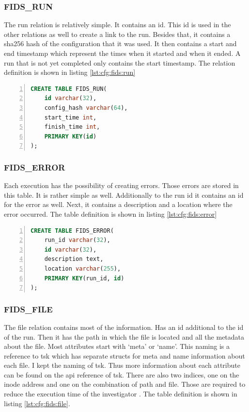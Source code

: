 \subsubsection{FIDS\_RUN}

The run relation is relatively simple. It contains an \gls{id}. This \gls{id} is used in the other relations as well to create a link to the run. Besides that, it contains a \gls{sha256} hash of the configuration that it was used. It then contains a start and end timestamp which represent the times when it started and when it ended. A run that is not yet completed only contains the start timestamp. The relation definition is shown in listing \ref{lst:cfg:fids:run}

\begin{lstlisting}[language=sql, numbers=left, caption=Fids Run Table Definition, label=lst:cfg:fids:run]
CREATE TABLE FIDS_RUN(
	id varchar(32), 
	config_hash varchar(64), 
	start_time int, 
	finish_time int, 
	PRIMARY KEY(id)
);
\end{lstlisting}

\subsubsection{FIDS\_ERROR}

Each execution has the possibility of creating errors. Those errors are stored in this table. It is rather simple as well. Additionally to the run \gls{id} it contains an \gls{id} for the error as well. Next, it contains a description and a location where the error occurred. The table definition is shown in listing \ref{lst:cfg:fids:error}

\begin{lstlisting}[language=sql, numbers=left, caption=Fids Error Table Definition, label=lst:cfg:fids:error]
CREATE TABLE FIDS_ERROR(
	run_id varchar(32), 
	id varchar(32), 
	description text, 
	location varchar(255), 
	PRIMARY KEY(run_id, id)
);
\end{lstlisting}

\subsubsection{FIDS\_FILE}

The file relation contains most of the information. Has an \gls{id} additional to the \gls{id} of the run. Then it has the path in which the file is located and all the \gls{metadata} about the file. Most attributes start with `meta' or `name'. This naming is a reference to \gls{tsk} which has separate structs for meta and name information about each file. I kept the naming of \gls{tsk}. Thus more information about each attribute can be found on the \gls{api} reference of \gls{tsk}. There are also two indices, one on the inode address and one on the combination of path and file. Those are required to reduce the execution time of the investigator \cite{tsk:file:struct}. The table definition is shown in listing \ref{lst:cfg:fids:file}.

